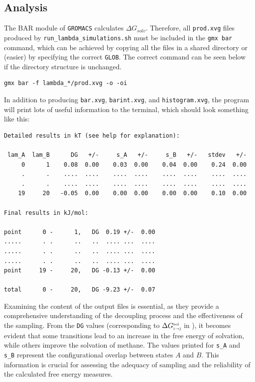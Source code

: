 \documentclass[9pt,tutorial]{livecoms}
\newcommand{\code}[1]{\colorbox{light-gray}{\texttt{#1}}}
\begin{document}
\subsection*{Analysis}
The BAR module of \texttt{GROMACS} calculates $\Delta G_{solv}$. Therefore, all \code{prod.xvg} files produced by \code{run\_lambda\_simulations.sh} must be included in the \code{gmx bar} command, which can be achieved by copying all the files in a shared directory or (easier) by specifying the correct \texttt{GLOB}. The correct command can be seen below if the directory structure is unchanged.
\begin{lstlisting}
gmx bar -f lambda_*/prod.xvg -o -oi
\end{lstlisting}
In addition to producing \code{bar.xvg}, \code{barint.xvg}, and \code{histogram.xvg}, the program will print lots of useful information to the terminal, which should look something like this:
\begin{lstlisting}
Detailed results in kT (see help for explanation):

 lam_A  lam_B      DG   +/-     s_A   +/-     s_B   +/-   stdev   +/- 
     0      1    0.08  0.00    0.03  0.00    0.04  0.00    0.24  0.00
     .      .    ....  ....    ....  ....    ....  ....    ....  ....
     .      .    ....  ....    ....  ....    ....  ....    ....  ....
    19     20   -0.05  0.00    0.00  0.00    0.00  0.00    0.10  0.00

Final results in kJ/mol:

point      0 -      1,   DG  0.19 +/-  0.00
.....      . .      ..   ..  .... ...  ....
.....      . .      ..   ..  .... ...  ....
.....      . .      ..   ..  .... ...  ....
point     19 -     20,   DG -0.13 +/-  0.00

total      0 -     20,   DG -9.23 +/-  0.07
\end{lstlisting}
Examining the content of the output files is essential, as they provide a comprehensive understanding of the decoupling process and the effectiveness of the sampling. From the \texttt{DG} values (corresponding to $\Delta G_\text{\tiny i$\to$j}^\text{\tiny sol}$ in ), it becomes evident that some transitions lead to an increase in the free energy of solvation, while others improve the solvation of methane. The values printed for \texttt{s\_A} and \texttt{s\_B} represent the configurational overlap between states $A$ and $B$. This information is crucial for assessing the adequacy of sampling and the reliability of the calculated free energy measures.\cite{Wu_2005}\\
\end{document}
